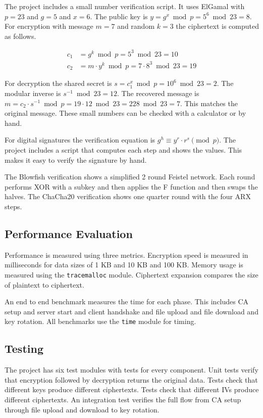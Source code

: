 \documentclass[12pt,a4paper]{article}
\begin{document}
The project includes a small number verification script. It uses ElGamal with $p = 23$ and $g = 5$ and $x = 6$. The public key is $y = g^x \bmod p = 5^6 \bmod 23 = 8$. For encryption with message $m = 7$ and random $k = 3$ the ciphertext is computed as follows.

\begin{align}
c_1 &= g^k \bmod p = 5^3 \bmod 23 = 10 \\
c_2 &= m \cdot y^k \bmod p = 7 \cdot 8^3 \bmod 23 = 19
\end{align}

For decryption the shared secret is $s = c_1^x \bmod p = 10^6 \bmod 23 = 2$. The modular inverse is $s^{-1} \bmod 23 = 12$. The recovered message is $m = c_2 \cdot s^{-1} \bmod p = 19 \cdot 12 \bmod 23 = 228 \bmod 23 = 7$. This matches the original message. These small numbers can be checked with a calculator or by hand.

For digital signatures the verification equation is $g^h \equiv y^r \cdot r^s \pmod{p}$. The project includes a script that computes each step and shows the values. This makes it easy to verify the signature by hand.

The Blowfish verification shows a simplified 2 round Feistel network. Each round performs XOR with a subkey and then applies the F function and then swaps the halves. The ChaCha20 verification shows one quarter round with the four ARX steps.

\subsection{Performance Evaluation}

Performance is measured using three metrics. Encryption speed is measured in milliseconds for data sizes of 1 KB and 10 KB and 100 KB. Memory usage is measured using the \texttt{tracemalloc} module. Ciphertext expansion compares the size of plaintext to ciphertext.

An end to end benchmark measures the time for each phase. This includes CA setup and server start and client handshake and file upload and file download and key rotation. All benchmarks use the \texttt{time} module for timing.

\subsection{Testing}

The project has six test modules with tests for every component. Unit tests verify that encryption followed by decryption returns the original data. Tests check that different keys produce different ciphertexts. Tests check that different IVs produce different ciphertexts. An integration test verifies the full flow from CA setup through file upload and download to key rotation.
\end{document}
